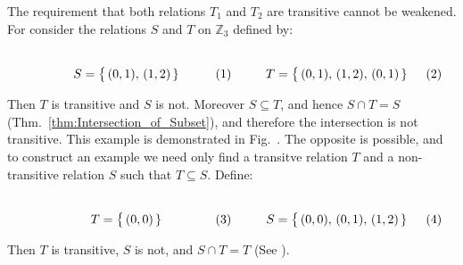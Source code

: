     \begin{example}
        The requirement that both relations $T_{1}$ and $T_{2}$ are transitive
        cannot be weakened. For consider the relations $S$ and $T$ on
        $\mathbb{Z}_{3}$ defined by:
        \par\hfill\par
        \begin{subequations}
            \begin{minipage}[b]{0.49\textwidth}
                \centering
                \begin{equation}
                    S=\big\{\,(0,1),\,(1,2)\,\}
                \end{equation}
            \end{minipage}
            \hfill
            \begin{minipage}[b]{0.49\textwidth}
                \centering
                \begin{equation}
                    T=\big\{\,(0,1),\,(1,2),\,(0,1)\,\}
                \end{equation}
            \end{minipage}
        \end{subequations}
        \par\vspace{2.5ex}
        Then $T$ is transitive and $S$ is not. Moreover $S\subseteq{T}$, and
        hence $S\cap{T}=S$ (Thm.~\ref{thm:Intersection_of_Subset}), and
        therefore the intersection is not transitive. This example is
        demonstrated in
        Fig.~. The
        opposite is possible, and to construct an example we need only find a
        transitve relation $T$ and a non-transitive relation $S$ such that
        $T\subseteq{S}$. Define:
        \par\hfill\par
        \begin{subequations}
            \begin{minipage}[b]{0.49\textwidth}
                \centering
                \begin{equation}
                    T=\big\{\,(0,0)\,\}
                \end{equation}
            \end{minipage}
            \hfill
            \begin{minipage}[b]{0.49\textwidth}
                \centering
                \begin{equation}
                    S=\big\{\,(0,0),\,(0,1),\,(1,2)\,\}
                \end{equation}
            \end{minipage}
        \end{subequations}
        \par\vspace{2.5ex}
        Then $T$ is transitive, $S$ is not, and $S\cap{T}=T$
        (See ).
    \end{example}
